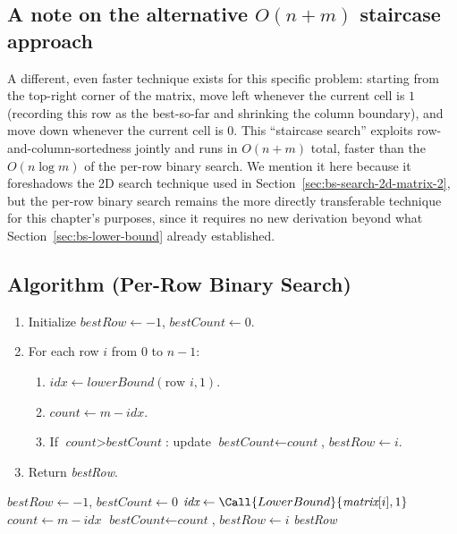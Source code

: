\subsection*{A note on the alternative $O(n+m)$ staircase approach}

A different, even faster technique exists for this specific problem:
starting from the top-right corner of the matrix, move left whenever the
current cell is $1$ (recording this row as the best-so-far and shrinking
the column boundary), and move down whenever the current cell is $0$. This
``staircase search'' exploits row-and-column-sortedness jointly and runs
in $O(n+m)$ total, faster than the $O(n \log m)$ of the per-row binary
search. We mention it here because it foreshadows the 2D search technique
used in Section~\ref{sec:bs-search-2d-matrix-2}, but the per-row binary
search remains the more directly transferable technique for this
chapter's purposes, since it requires no new derivation beyond what
Section~\ref{sec:bs-lower-bound} already established.

\subsection*{Algorithm (Per-Row Binary Search)}

\begin{enumerate}
  \item Initialize $\textit{bestRow} \gets -1$, $\textit{bestCount}
        \gets 0$.
  \item For each row $i$ from $0$ to $n-1$:
  \begin{enumerate}
    \item $\textit{idx} \gets \textit{lowerBound}(\text{row } i, 1)$.
    \item $\textit{count} \gets m - \textit{idx}$.
    \item If $\textit{count} > \textit{bestCount}$: update
          $\textit{bestCount} \gets \textit{count}$,
          $\textit{bestRow} \gets i$.
  \end{enumerate}
  \item Return \textit{bestRow}.
\end{enumerate}

\begin{algorithm}[H]
\caption{Row with Maximum Number of 1s}
\begin{algorithmic}[1]
  \State $\textit{bestRow} \gets -1$, $\textit{bestCount} \gets 0$
    \State $\textit{idx} \gets \Call{LowerBound}{\textit{matrix}[i], 1}$
    \State $\textit{count} \gets m - \textit{idx}$
      \State $\textit{bestCount} \gets \textit{count}$, $\textit{bestRow} \gets i$
    \EndIf
  \EndFor
  \State \Return \textit{bestRow}
\EndProcedure
\end{algorithmic}
\end{algorithm}

